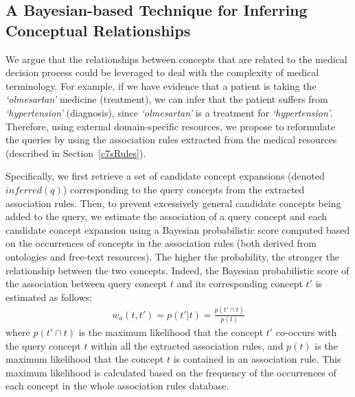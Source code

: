 \documentclass[1p]{elsarticle}
\begin{document}

\subsection{A Bayesian-based Technique for Inferring Conceptual Relationships}\label{All}
 We argue that the relationships between concepts that are related to the medical decision process could be leveraged to deal with the complexity of medical terminology.
For example, if we have evidence that a patient is taking the \emph{`olmesartan'} medicine (treatment), we can infer that the patient suffers from \emph{`hypertension'} (diagnosis), since \emph{`olmesartan'} is a treatment for \emph{`hypertension'}. Therefore, using external domain-specific resources, we propose to 
reformulate the queries by using the association rules extracted from the medical resources (described in Section~\ref{c7sRules}). 

Specifically, we first retrieve a set of candidate concept expansions (denoted $inferred(q)$) corresponding to the query concepts from the extracted association rules. Then, to prevent excessively general candidate concepts being added to the query, we estimate the association of a query concept and each candidate concept expansion using a Bayesian probabilistic score computed based on the occurrences of concepts in the association rules (both derived from ontologies and free-text resources). The higher the probability, the stronger the relationship between the two concepts. Indeed, the Bayesian probabilistic score of the association between query concept $t$ and its corresponding concept $t'$ is estimated as follows:
\begin{align}\label{eq:conditional}
w_a(t,t') = p(t'|t) = \frac{p(t' \cap t)}{p(t)}
\end{align}
where $p(t' \cap t)$ is the maximum likelihood that the concept $t'$ co-occurs with the query concept $t$ within all the extracted association rules, and $p(t)$ is the maximum likelihood that the concept $t$ is contained in an association rule. 
This maximum likelihood is calculated based on the frequency of the occurrences of each concept in the whole association rules database.
\end{document}
